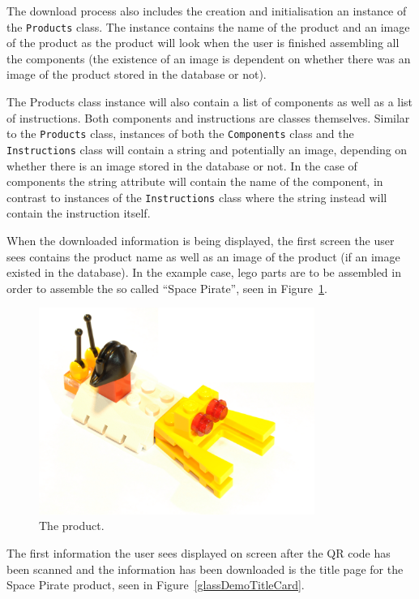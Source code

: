 The download process also includes the creation and initialisation an instance of the \texttt{Products} class. The instance contains the name of the product and an image of the product as the product will look when the user is finished assembling all the components (the existence of an image is dependent on whether there was an image of the product stored in the database or not).

The Products class instance will also contain a list of components as well as a list of instructions. Both components and instructions are classes themselves. Similar to the \texttt{Products} class, instances of both the \texttt{Components} class and the \texttt{Instructions} class will contain a string and potentially an image, depending on whether there is an image stored in the database or not. In the case of components the string attribute will contain the name of the component, in contrast to instances of the \texttt{Instructions} class where the string instead will contain the instruction itself.

When the downloaded information is being displayed, the first screen the user sees contains the product name as well as an image of the product (if an image existed in the database). In the example case, lego parts are to be assembled in order to assemble the so called ``Space Pirate'', seen in Figure~\ref{glassDemoRaw}.

	\begin{figure}[ht!]
		\centering
		\includegraphics[width=90mm]{images/rawImages/BILD_6}
		\caption{The product.}
		\label{glassDemoRaw}
	\end{figure}

The first information the user sees displayed on screen after the QR code has been scanned and the information has been downloaded is the title page for the Space Pirate product, seen in Figure~\ref{glassDemoTitleCard}.

